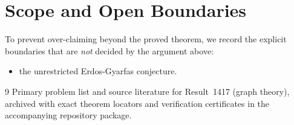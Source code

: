 \documentclass[10pt,reqno]{amsart}
\theoremstyle{definition}
\begin{document}
\section{Scope and Open Boundaries}

To prevent over-claiming beyond the proved theorem, we record the explicit boundaries that are \emph{not} decided by the argument above:
\begin{itemize}
  \item the unrestricted Erdos-Gyarfas conjecture.
\end{itemize}

\begin{thebibliography}{9}
Primary problem list and source literature for Result~1417 (graph theory), archived with exact theorem locators and verification certificates in the accompanying repository package.
\end{thebibliography}
\end{document}
